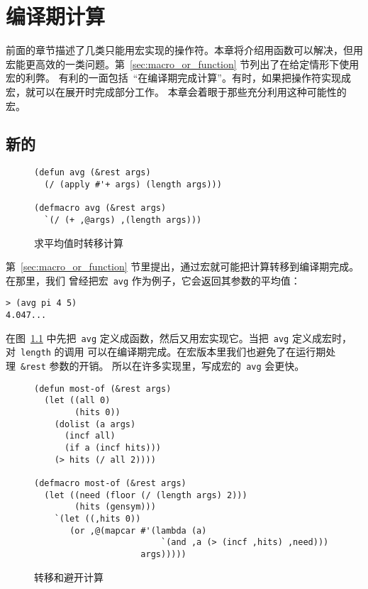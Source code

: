 
\chapter{编译期计算}
\label{chap:computation_at_compile-time}

前面的章节描述了几类只能用宏实现的操作符。本章将介绍用函数可以解决，但用宏能更高效的一类问题。第~\ref{sec:macro_or_function} 节列出了在给定情形下使用宏的利弊。
有利的一面包括~``在编译期完成计算''。有时，如果把操作符实现成宏，就可以在展开时完成部分工作。
本章会着眼于那些充分利用这种可能性的宏。

\section{新的\utility{}}
\label{sec:new_utility_13}

\begin{figure}
\begin{lstlisting}
(defun avg (&rest args)
  (/ (apply #'+ args) (length args)))

(defmacro avg (&rest args)
  `(/ (+ ,@args) ,(length args)))
\end{lstlisting}
  \caption{求平均值时转移计算}
  \label{fig:shifting_computation_when_finding_averages}
\end{figure}

第~\ref{sec:macro_or_function} 节里提出，通过宏就可能把计算转移到编译期完成。在那里，我们
曾经把宏~\verb|avg| 作为例子，它会返回其参数的平均值：
\begin{lstlisting}
> (avg pi 4 5)
4.047...
\end{lstlisting}
在图~\ref{fig:shifting_computation_when_finding_averages} 中先把~\verb|avg|
定义成函数，然后又用宏实现它。当把~\verb|avg| 定义成宏时，对~\verb|length| 的调用
可以在编译期完成。在宏版本里我们也避免了在运行期处理~\verb|&rest| 参数的开销。
所以在许多实现里，写成宏的~\verb|avg| 会更快。

\begin{figure}
\begin{lstlisting}
(defun most-of (&rest args)
  (let ((all 0)
        (hits 0))
    (dolist (a args)
      (incf all)
      (if a (incf hits)))
    (> hits (/ all 2))))

(defmacro most-of (&rest args)
  (let ((need (floor (/ (length args) 2)))
        (hits (gensym)))
    `(let ((,hits 0))
       (or ,@(mapcar #'(lambda (a)
                         `(and ,a (> (incf ,hits) ,need)))
                     args)))))
\end{lstlisting}
  \caption{转移和避开计算}
  \label{fig:shifting_and_avoiding_computation}
\end{figure}

